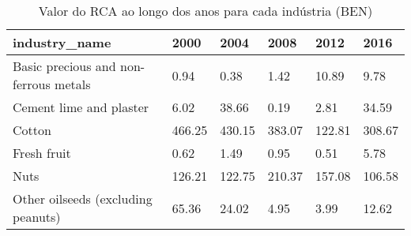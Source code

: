 \begin{table}
\centering
\caption{Valor do RCA ao longo dos anos para cada indústria (BEN)}
\begin{tabular}{p{6cm}p{1.5cm}p{1.5cm}p{1.5cm}p{1.5cm}p{1.5cm}}
\toprule
                        industry\_name &   2000 &   2004 &   2008 &   2012 &   2016 \\
\midrule
Basic precious and non-ferrous metals &   0.94 &   0.38 &   1.42 &  10.89 &   9.78 \\
              Cement lime and plaster &   6.02 &  38.66 &   0.19 &   2.81 &  34.59 \\
                               Cotton & 466.25 & 430.15 & 383.07 & 122.81 & 308.67 \\
                          Fresh fruit &   0.62 &   1.49 &   0.95 &   0.51 &   5.78 \\
                                 Nuts & 126.21 & 122.75 & 210.37 & 157.08 & 106.58 \\
   Other oilseeds (excluding peanuts) &  65.36 &  24.02 &   4.95 &   3.99 &  12.62 \\
\bottomrule
\end{tabular}
\end{table}
